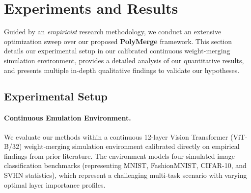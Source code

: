\section{Experiments and Results}
\label{sec:experiments}

Guided by an \emph{empiricist} research methodology, we conduct an extensive optimization sweep over our proposed \textbf{PolyMerge} framework. This section details our experimental setup in our calibrated continuous weight-merging simulation environment, provides a detailed analysis of our quantitative results, and presents multiple in-depth qualitative findings to validate our hypotheses.

\subsection{Experimental Setup}
\paragraph{Continuous Emulation Environment.} We evaluate our methods within a continuous 12-layer Vision Transformer (ViT-B/32) weight-merging simulation environment calibrated directly on empirical findings from prior literature. The environment models four simulated image classification benchmarks (representing MNIST, FashionMNIST, CIFAR-10, and SVHN statistics), which represent a challenging multi-task scenario with varying optimal layer importance profiles.

